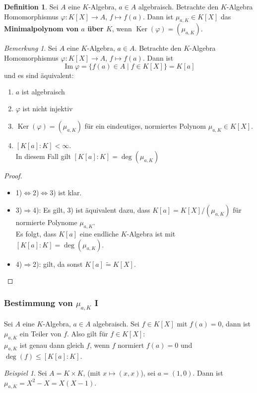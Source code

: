 \documentclass[10pt,a4paper]{article}
\newcommand{\isomorph}{\ensuremath{\tilde{=}}}
\newcommand{\Ker}{\ensuremath{\operatorname{Ker}}}
\newcommand{\Img}{\ensuremath{\operatorname{Im}}}
\newcounter{thm}[section]
\let\oldsubsubsection\subsubsection
\renewcommand{\subsubsection}{\stepcounter{thm}\oldsubsubsection}
\theoremstyle{definition}
\newtheorem{definition}[thm]{Definition}
\theoremstyle{plain}
\theoremstyle{remark}
\newtheorem*{bem*}{Bemerkung}
\newtheorem*{exm*}{Beispiel}
\begin{document}
\begin{definition}
	Sei $A$ eine $K$-Algebra, $a\in A$ algebraisch. Betrachte den $K$-Algebra Homomorphismus $\varphi:K[X]\rightarrow A$, $f\mapsto f(a)$.
	Dann ist $\mu_{a,K}\in K[X]$ das \textbf{Minimalpolynom von $a$ über $K$}, wenn $\Ker(\varphi)=(\mu_{a,K})$.
\end{definition}
\begin{bem*}
	Sei $A$ eine $K$-Algebra, $a\in A$. Betrachte den $K$-Algebra Homomorphismus $\varphi:K[X]\rightarrow A$, $f\mapsto f(a)$. Dann ist
	\[\Img\varphi=\{f(a)\in A\mid f\in K[X]\}=K[a]\]
	und es sind äquivalent:
	\begin{enumerate}
		\item $a$ ist algebraisch
		\item $\varphi$ ist nicht injektiv
		\item $\Ker(\varphi)=(\mu_{a,K})$ für ein eindeutiges, normiertes Polynom $\mu_{a,K}\in K[X]$.
		\item  $[K[a]:K]<\infty$.\\
		In diesem Fall gilt $[K[a]:K]=\deg(\mu_{a,K})$
	\end{enumerate}
\end{bem*}
\begin{proof}
	\begin{itemize}
		\item 1)$\Leftrightarrow$2)$\Leftrightarrow$3) ist klar.
		\item 3)$\Rightarrow$4): Es gilt, 3) ist äquivalent dazu, dass $K[a]=K[X]/(\mu_{a,K})$ für normierte Polynome $\mu_{a,K}$.\\
		Es folgt, dass $K[a]$ eine endliche $K$-Algebra ist mit $[K[a]:K]=\deg(\mu_{a,K})$.
		\item 4)$\Rightarrow$2): gilt, da sonst $K[a]\isomorph K[X]$.
	\end{itemize}
	
\end{proof}

\subsubsection{Bestimmung von $\mu_{a,K}$ I} Sei $A$ eine $K$-Algebra, $a\in A$ algebraisch. Sei $f\in K[X]$ mit $f(a)=0$, dann ist $\mu_{a,K}$ ein Teiler von $f$. Also gilt für $f\in K[X]$:\\
$\mu_{a,K}$ ist genau dann gleich $f$, wenn $f$ normiert $f(a)=0$ und $\deg(f)\leq [K[a]:K]$.

\begin{exm*}
	Sei $A=K\times K$, (mit $x\mapsto (x,x)$), sei $a=(1,0)$. Dann ist $\mu_{a,K}=X^2-X=X(X-1)$.
\end{exm*}
\end{document}

